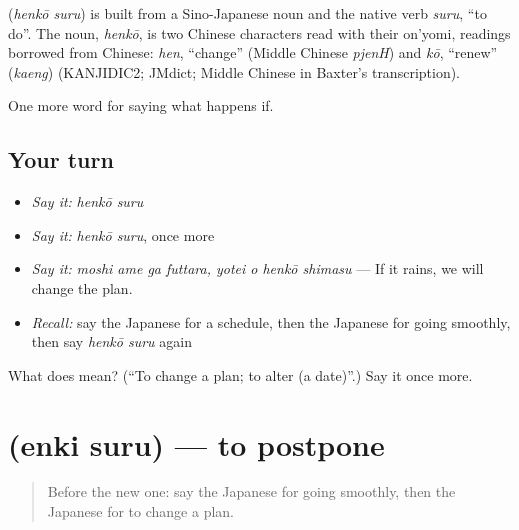 \begin{cousinweb}
\textbf{} (\emph{henkō suru}) is built from a Sino-Japanese noun and the native verb \emph{suru}, \textquotedblleft{}to do\textquotedblright{}. The noun, \emph{henkō}, is two Chinese characters read with their on'yomi, readings borrowed from Chinese: \emph{hen}, \textquotedblleft{}change\textquotedblright{} (Middle Chinese \emph{pjenH}) and \emph{kō}, \textquotedblleft{}renew\textquotedblright{} (\emph{kaeng}) (KANJIDIC2; JMdict; Middle Chinese in Baxter's transcription).
\end{cousinweb}

\begin{grammarlens}[title={What you've built}]
One more word for saying what happens if.
\end{grammarlens}

\subsection*{Your turn}
\begin{itemize}
\raggedright
  \item \emph{Say it:} \emph{henkō suru}
  \item \emph{Say it:} \emph{henkō suru}, once more
  \item \emph{Say it:} \emph{moshi ame ga futtara, yotei o henkō shimasu} — If it rains, we will change the plan.
  \item \emph{Recall:} say the Japanese for a schedule, then the Japanese for going smoothly, then say \emph{henkō suru} again
\end{itemize}

\begin{tcolorbox}[breakable,colback=teal!4,colframe=teal!35!black,title={Before you move on}]
What does  mean? (\textquotedblleft{}To change a plan; to alter (a date)\textquotedblright{}.) Say it once more.
\end{tcolorbox}
\section[\texorpdfstring{\ja{えんきする} (enki suru)}{えんきする (enki suru)}]{ (enki suru) — to postpone}

\label{lesson:JA-C345-enki-suru}



\begin{quote}
Before the new one: say the Japanese for going smoothly, then the Japanese for to change a plan.
\end{quote}

